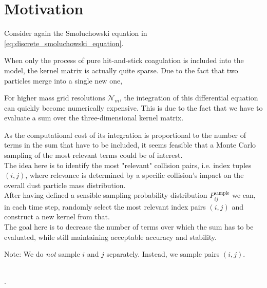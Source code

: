 
\section{Motivation}

    Consider again the Smoluchowski equation in \cref{eq:discrete_smoluchowski_equation}.

    When only the process of pure hit-and-stick coagulation is included into the model, the 
    kernel matrix is actually quite sparse. Due to the fact that two particles merge into a 
    single new one, 

    For higher mass grid resolutions $\mathcal N_m$, 
    the integration of this differential equation can quickly become numerically expensive.
    This is due to the fact that we have to evaluate a sum over the three-dimensional
    kernel matrix. 



    As the computational cost of its integration is proportional to the number of terms 
    in the sum that have to be included, it seems feasible that a Monte Carlo sampling of 
    the most relevant terms could be of interest. \\

    The idea here is to identify the most "relevant" collision pairs, i.e. index tuples $(i, j)$,
    where relevance is determined by a specific collision's impact on the overall dust particle 
    mass distribution. \\

    After having defined a sensible sampling probability distribution $P_{ij}^\text{sample}$
    we can, in each time step, randomly select the most relevant index pairs $(i, j)$ and 
    construct a new kernel from that. \\

    The goal here is to decrease the number of terms over which the sum has to be evaluated,
    while still maintaining acceptable accuracy and stability.

    Note: We do \textit{not} sample $i$ and $j$ separately. Instead, we sample pairs $(i, j)$.


     \\
    . \\

